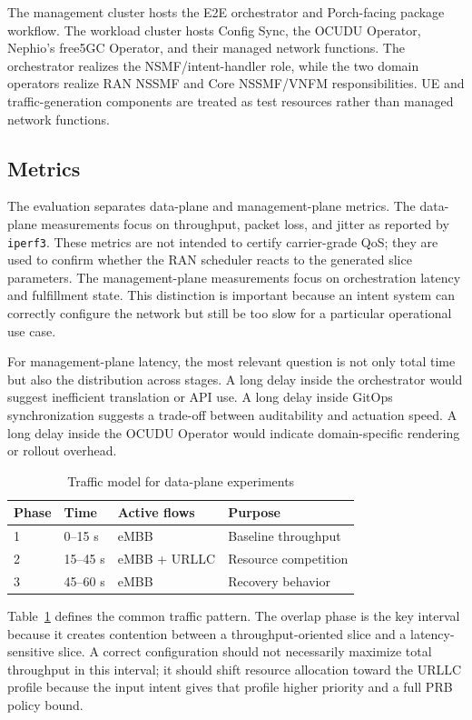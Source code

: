 The management cluster hosts the E2E orchestrator and Porch-facing package workflow. The workload cluster hosts Config Sync, the OCUDU Operator, Nephio's free5GC Operator, and their managed network functions. The orchestrator realizes the NSMF/intent-handler role, while the two domain operators realize RAN NSSMF and Core NSSMF/VNFM responsibilities. UE and traffic-generation components are treated as test resources rather than managed network functions.

\subsection{Metrics}

The evaluation separates data-plane and management-plane metrics. The data-plane measurements focus on throughput, packet loss, and jitter as reported by \texttt{iperf3}. These metrics are not intended to certify carrier-grade QoS; they are used to confirm whether the RAN scheduler reacts to the generated slice parameters. The management-plane measurements focus on orchestration latency and fulfillment state. This distinction is important because an intent system can correctly configure the network but still be too slow for a particular operational use case.

For management-plane latency, the most relevant question is not only total time but also the distribution across stages. A long delay inside the orchestrator would suggest inefficient translation or API use. A long delay inside GitOps synchronization suggests a trade-off between auditability and actuation speed. A long delay inside the OCUDU Operator would indicate domain-specific rendering or rollout overhead.

\begin{table}[t]
  \caption{Traffic model for data-plane experiments}
  \label{tab:traffic_model}
  \begin{tabular}{llll}
    \toprule
    Phase & Time & Active flows & Purpose \\
    \midrule
    1 & 0--15 s & eMBB & Baseline throughput \\
    2 & 15--45 s & eMBB + URLLC & Resource competition \\
    3 & 45--60 s & eMBB & Recovery behavior \\
    \bottomrule
  \end{tabular}
\end{table}

Table~\ref{tab:traffic_model} defines the common traffic pattern. The overlap phase is the key interval because it creates contention between a throughput-oriented slice and a latency-sensitive slice. A correct configuration should not necessarily maximize total throughput in this interval; it should shift resource allocation toward the URLLC profile because the input intent gives that profile higher priority and a full PRB policy bound.

